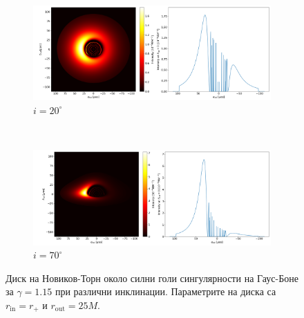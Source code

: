\begin{figure}[!htb]
	\begin{subfigure}{12cm}
		\hspace{-0.6cm}
		\includegraphics[scale = 0.26]{GB_NT_Gamma1.15_20_deg.png}
		\caption{$i = 20^\circ$} 
	\end{subfigure}\\
	\begin{subfigure}{12cm}
		\hspace{-0.6cm}
		\includegraphics[scale = 0.26]{GB_NT_Gamma1.15_70_deg.png}
		\caption{$i = 70^\circ$} 
	\end{subfigure}
	\caption[Диск на Новиков-Торн около силни голи сингулярности на Гаус Боне при различни инклинации.]{\small Диск на Новиков-Торн около силни голи сингулярности на Гаус-Боне за $\gamma = 1.15$ при различни инклинации. Параметрите на диска са $r_\text{in} = r_\text{+}$ и $r_\text{out} = 25M$.} 
	\label{GB_NT}
\end{figure}



\newpage